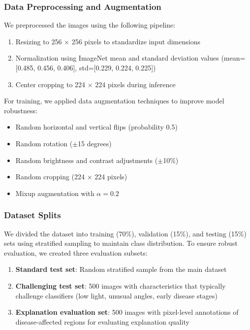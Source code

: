 \subsubsection{Data Preprocessing and Augmentation}

We preprocessed the images using the following pipeline:

\begin{enumerate}
    \item Resizing to 256 $\times$ 256 pixels to standardize input dimensions
    \item Normalization using ImageNet mean and standard deviation values (mean=[0.485, 0.456, 0.406], std=[0.229, 0.224, 0.225])
    \item Center cropping to 224 $\times$ 224 pixels during inference
\end{enumerate}

For training, we applied data augmentation techniques to improve model robustness:

\begin{itemize}
    \item Random horizontal and vertical flips (probability 0.5)
    \item Random rotation ($\pm$15 degrees)
    \item Random brightness and contrast adjustments ($\pm$10\%)
    \item Random cropping (224 $\times$ 224 pixels)
    \item Mixup augmentation \cite{zhang2018mixup} with $\alpha=0.2$
\end{itemize}

\subsubsection{Dataset Splits}

We divided the dataset into training (70\%), validation (15\%), and testing (15\%) sets using stratified sampling to maintain class distribution. To ensure robust evaluation, we created three evaluation subsets:

\begin{enumerate}
    \item \textbf{Standard test set}: Random stratified sample from the main dataset
    \item \textbf{Challenging test set}: 500 images with characteristics that typically challenge classifiers (low light, unusual angles, early disease stages)
    \item \textbf{Explanation evaluation set}: 500 images with pixel-level annotations of disease-affected regions for evaluating explanation quality
\end{enumerate}

